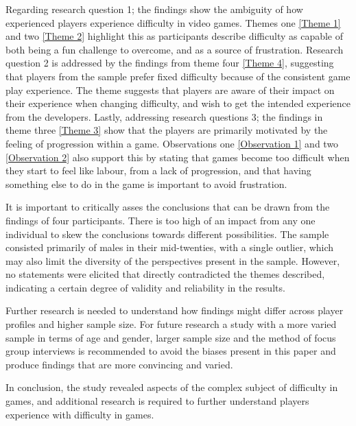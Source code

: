 Regarding research question 1; the findings show the ambiguity of how experienced players experience difficulty in video games. Themes one \ref{Theme 1} and two \ref{Theme 2} highlight this as participants describe difficulty as capable of both being a fun challenge to overcome, and as a source of frustration. Research question 2 is addressed by the findings from theme four \ref{Theme 4}, suggesting that players from the sample prefer fixed difficulty because of the consistent game play experience. The theme suggests that players are aware of their impact on their experience when changing difficulty, and wish to get the intended experience from the developers. Lastly, addressing research questions 3; the findings in theme three \ref{Theme 3} show that the players are primarily motivated by the feeling of progression within a game. Observations one \ref{Observation 1} and two \ref{Observation 2} also support this by stating that games become too difficult when they start to feel like labour, from a lack of progression, and that having something else to do in the game is important to avoid frustration.

It is important to critically asses the conclusions that can be drawn from the findings of four participants. There is too high of an impact from any one individual to skew the conclusions towards different possibilities. The sample consisted primarily of males in their mid-twenties, with a single outlier, which may also limit the diversity of the perspectives present in the sample.  However, no statements were elicited that directly contradicted the themes described, indicating a certain degree of validity and reliability in the results.

Further research is needed to understand how findings might differ across player profiles and higher sample size. For future research a study with a more varied sample in terms of age and gender, larger sample size and the method of focus group interviews is recommended to avoid the biases present in this paper and produce findings that are more convincing and varied.

In conclusion, the study revealed aspects of the complex subject of difficulty in games, and additional research is required to further understand players experience with difficulty in games.

\clearpage